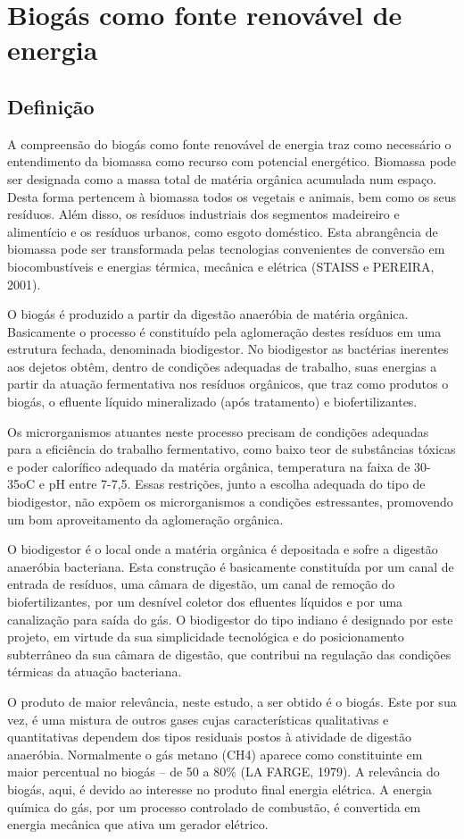 \section {Biogás como fonte renovável de energia}
\subsection {Definição}

A compreensão do biogás como fonte renovável de energia traz como necessário o entendimento da biomassa como recurso com potencial energético. Biomassa pode ser designada como a massa total de matéria orgânica acumulada num espaço. Desta forma pertencem à biomassa todos os vegetais e animais, bem como os seus resíduos. Além disso, os resíduos industriais dos segmentos madeireiro e alimentício e os resíduos urbanos, como esgoto doméstico. Esta abrangência de biomassa pode ser transformada pelas tecnologias convenientes de conversão em biocombustíveis e energias térmica, mecânica e elétrica (STAISS e PEREIRA, 2001).
\par O biogás é produzido a partir da digestão anaeróbia de matéria orgânica. Basicamente o processo é constituído pela aglomeração destes resíduos em uma estrutura fechada, denominada biodigestor. No biodigestor as bactérias inerentes aos dejetos obtêm, dentro de condições adequadas de trabalho, suas energias a partir da atuação fermentativa nos resíduos orgânicos, que traz como produtos o biogás, o efluente líquido mineralizado (após tratamento) e biofertilizantes.
\par Os microrganismos atuantes neste processo precisam de condições adequadas para a eficiência do trabalho fermentativo, como baixo teor de substâncias tóxicas e poder calorífico adequado da matéria orgânica, temperatura na faixa de 30-35oC e pH entre 7-7,5. Essas restrições, junto a escolha adequada do tipo de biodigestor, não expõem os microrganismos a condições estressantes, promovendo um bom aproveitamento da aglomeração orgânica.
\par O biodigestor é o local onde a matéria orgânica é depositada e sofre a digestão anaeróbia bacteriana. Esta construção é basicamente constituída por um canal de entrada de resíduos, uma câmara de digestão, um canal de remoção do biofertilizantes, por um desnível coletor dos efluentes líquidos e por uma canalização para saída do gás. O biodigestor do tipo indiano é designado por este projeto, em virtude da sua simplicidade tecnológica e do posicionamento subterrâneo da sua câmara de digestão, que contribui na regulação das condições térmicas da atuação bacteriana.
\par O produto de maior relevância, neste estudo, a ser obtido é o biogás. Este por sua vez, é uma mistura de outros gases cujas características qualitativas e quantitativas dependem dos tipos residuais postos à atividade de digestão anaeróbia. Normalmente o gás metano (CH4) aparece como constituinte em maior percentual no biogás – de 50 a 80\% (LA FARGE, 1979). A relevância do biogás, aqui, é devido ao interesse no produto final energia elétrica. A energia química do gás, por um processo controlado de combustão, é convertida em energia mecânica que ativa um gerador elétrico.

